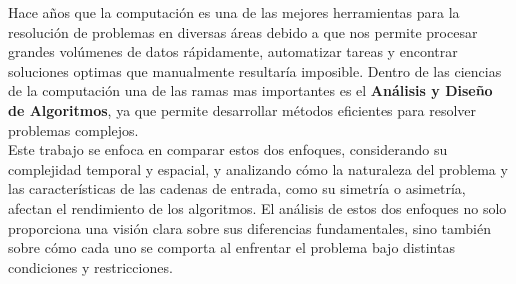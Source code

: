 Hace años que la computación es una de las mejores herramientas para la resolución de problemas en diversas áreas debido a que nos permite procesar grandes volúmenes de datos rápidamente, automatizar tareas y encontrar soluciones optimas que manualmente resultaría imposible. Dentro de las ciencias de la computación una de las ramas mas importantes es el \textbf{Análisis y Diseño de Algoritmos}, ya que permite desarrollar métodos eficientes para resolver problemas complejos.\\

Este trabajo se enfoca en comparar estos dos enfoques, considerando su complejidad temporal y espacial, y analizando cómo la naturaleza del problema y las características de las cadenas de entrada, como su simetría o asimetría, afectan el rendimiento de los algoritmos. El análisis de estos dos enfoques no solo proporciona una visión clara sobre sus diferencias fundamentales, sino también sobre cómo cada uno se comporta al enfrentar el problema bajo distintas condiciones y restricciones.